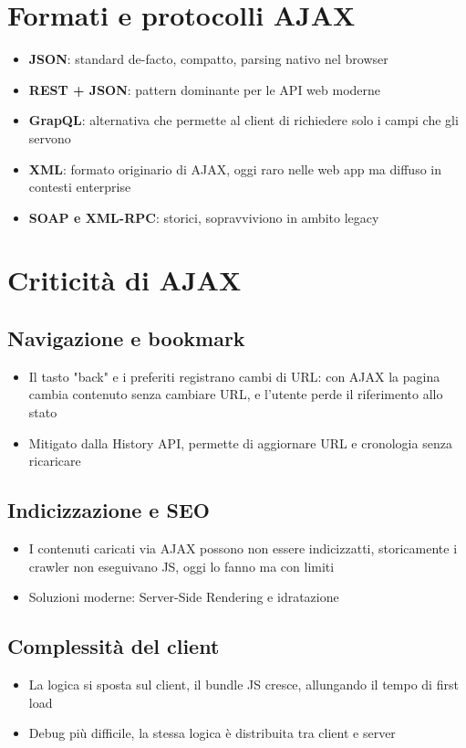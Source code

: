 \section{Formati e protocolli AJAX}
\begin{itemize}
    \item \textbf{JSON}: standard de-facto, compatto, parsing nativo nel browser
    \item \textbf{REST + JSON}: pattern dominante per le API web moderne
    \item \textbf{GrapQL}: alternativa che permette al client di richiedere solo i campi che gli servono
    \item \textbf{XML}: formato originario di AJAX, oggi raro nelle web app ma diffuso in contesti enterprise
    \item \textbf{SOAP e XML-RPC}: storici, sopravviviono in ambito legacy
\end{itemize}

\section{Criticità di AJAX}
\subsection{Navigazione e bookmark}
\begin{itemize}
    \item Il tasto "back" e i preferiti registrano cambi di URL: con AJAX la pagina cambia contenuto senza cambiare URL, e l'utente perde il riferimento allo stato
    \item Mitigato dalla History API, permette di aggiornare URL e cronologia senza ricaricare
\end{itemize}
\subsection{Indicizzazione e SEO}
\begin{itemize}
    \item I contenuti caricati via AJAX possono non essere indicizzatti, storicamente i crawler non eseguivano JS, oggi lo fanno ma con limiti
    \item Soluzioni moderne: Server-Side Rendering e idratazione
\end{itemize}
\subsection{Complessità del client}
\begin{itemize}
    \item La logica si sposta sul client, il bundle JS cresce, allungando il tempo di first load
    \item Debug più difficile, la stessa logica è distribuita tra client e server
\end{itemize}

